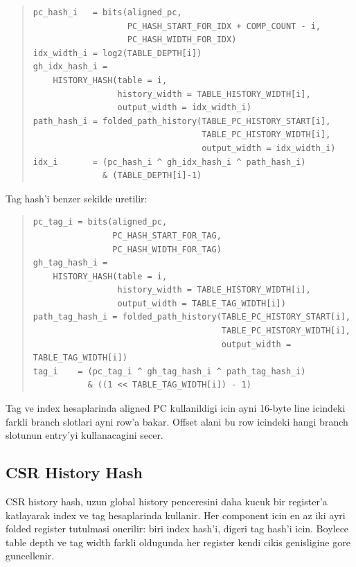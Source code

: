 \documentclass[11pt,a4paper]{article}
\begin{document}
\begin{quote}
\footnotesize
\begin{verbatim}
pc_hash_i   = bits(aligned_pc,
                   PC_HASH_START_FOR_IDX + COMP_COUNT - i,
                   PC_HASH_WIDTH_FOR_IDX)
idx_width_i = log2(TABLE_DEPTH[i])
gh_idx_hash_i =
    HISTORY_HASH(table = i,
                 history_width = TABLE_HISTORY_WIDTH[i],
                 output_width = idx_width_i)
path_hash_i = folded_path_history(TABLE_PC_HISTORY_START[i],
                                  TABLE_PC_HISTORY_WIDTH[i],
                                  output_width = idx_width_i)
idx_i       = (pc_hash_i ^ gh_idx_hash_i ^ path_hash_i)
              & (TABLE_DEPTH[i]-1)
\end{verbatim}
\end{quote}

Tag hash'i benzer sekilde uretilir:

\begin{quote}
\footnotesize
\begin{verbatim}
pc_tag_i = bits(aligned_pc,
                PC_HASH_START_FOR_TAG,
                PC_HASH_WIDTH_FOR_TAG)
gh_tag_hash_i =
    HISTORY_HASH(table = i,
                 history_width = TABLE_HISTORY_WIDTH[i],
                 output_width = TABLE_TAG_WIDTH[i])
path_tag_hash_i = folded_path_history(TABLE_PC_HISTORY_START[i],
                                      TABLE_PC_HISTORY_WIDTH[i],
                                      output_width = TABLE_TAG_WIDTH[i])
tag_i    = (pc_tag_i ^ gh_tag_hash_i ^ path_tag_hash_i)
           & ((1 << TABLE_TAG_WIDTH[i]) - 1)
\end{verbatim}
\end{quote}

Tag ve index hesaplarinda aligned PC kullanildigi icin ayni 16-byte line
icindeki farkli branch slotlari ayni row'a bakar. Offset alani bu row icindeki
hangi branch slotunun entry'yi kullanacagini secer.

\subsection{CSR History Hash}

CSR history hash, uzun global history penceresini daha kucuk bir register'a
katlayarak index ve tag hesaplarinda kullanir. Her component icin en az iki
ayri folded register tutulmasi onerilir: biri index hash'i, digeri tag hash'i
icin. Boylece table depth ve tag width farkli oldugunda her register kendi
cikis genisligine gore guncellenir.
\end{document}

